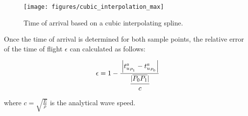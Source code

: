\begin{figure}[h]
	\centering
	\texttt{[image: figures/cubic\_interpolation\_max]}
	\caption{Time of arrival based on a cubic interpolating spline.}
	\label{fig:time_of_arrival_spline_peak}
\end{figure}

Once the time of arrival is determined for both sample points, the relative error of the time of flight $\epsilon$ can calculated as follows:

\begin{equation} \label{eq:time_of_flight_relative_error}
	\epsilon = 1 - \cfrac
		{ \left| t^a_{u_{P_1}} - t^a_{u_{P_0}} \right| }
		{ \cfrac{|\overline{P_0 P_1}|}{c} }
\end{equation}

where $c = \sqrt{\frac{E}{\rho}}$ is the analytical wave speed.